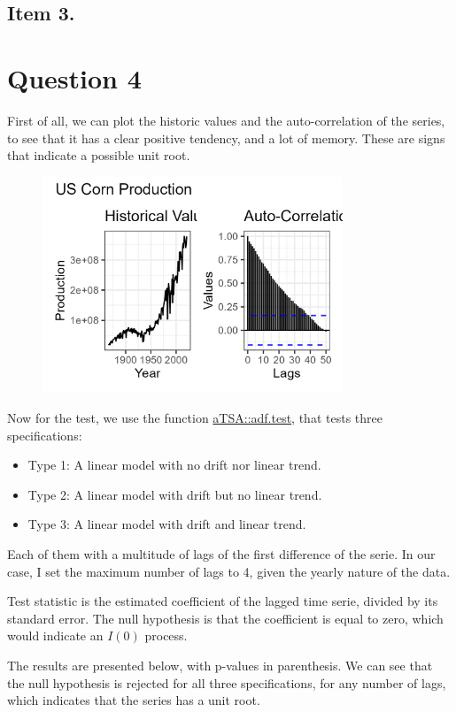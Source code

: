 \documentclass[12pt]{article}
\begin{document}
\subsection*{Item 3.}

\section*{Question 4}

First of all, we can plot the historic values and the auto-correlation of the series, to see that it has a clear positive tendency, and a lot of memory. These are signs that indicate a possible unit root.

\begin{figure}[H]
    \centering
    \includegraphics[width=0.8\textwidth]{figures/corn_prod.png}
\end{figure}

Now for the test, we use the function \href{https://rdrr.io/cran/aTSA/man/adf.test.html}{aTSA::adf.test}, that tests three specifications:

\begin{itemize}
    \item Type 1: A linear model with no drift nor linear trend.
    \item Type 2: A linear model with drift but no linear trend.
    \item Type 3: A linear model with drift and linear trend.
\end{itemize}

Each of them with a multitude of lags of the first difference of the serie. In our case, I set the maximum number of lags to 4, given the yearly nature of the data.

Test statistic is the estimated coefficient of the lagged time serie, divided by its standard error. The null hypothesis is that the coefficient is equal to zero, which would indicate an $I(0)$ process.

The results are presented below, with p-values in parenthesis. We can see that the null hypothesis is rejected for all three specifications, for any number of lags, which indicates that the series has a unit root.


\end{document}
